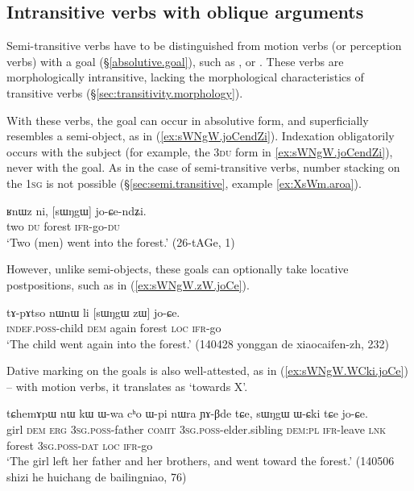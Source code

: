 \subsection{Intransitive verbs with oblique arguments} \label{sec:intr.goal}
Semi-transitive verbs have to be distinguished from motion verbs (or perception verbs) with a goal (§\ref{absolutive.goal}), such as ,  or . These verbs are morphologically intransitive, lacking the morphological characteristics of transitive verbs (§\ref{sec:transitivity.morphology}). 
 
With these verbs, the goal can occur in absolutive form, and superficially resembles a semi-object, as  in (\ref{ex:sWNgW.joCendZi}). Indexation obligatorily occurs with the subject (for example, the \textsc{3du} form in \ref{ex:sWNgW.joCendZi}), never with the goal. As in the case of semi-transitive verbs, number stacking on the \textsc{1sg}  is not possible (§\ref{sec:semi.transitive}, example \ref{ex:XsWm.aroa}).

\begin{exe}
\ex   \label{ex:sWNgW.joCendZi}
 \gll ʁnɯz ni, [sɯŋgɯ] jo-ɕe-ndʑi. \\
two \textsc{du} forest \textsc{ifr}-go-\textsc{du} \\
\glt `Two (men) went into the forest.' (26-tAGe, 1)
\end{exe}

However, unlike semi-objects, these goals can optionally take locative postpositions, such as  in (\ref{ex:sWNgW.zW.joCe}).

\begin{exe}
\ex   \label{ex:sWNgW.zW.joCe}
 \gll tɤ-pɤtso nɯnɯ li [sɯŋgɯ zɯ] jo-ɕe. \\
 \textsc{indef}.\textsc{poss}-child \textsc{dem} again forest \textsc{loc} \textsc{ifr}-go \\
 \glt `The child went again into the forest.' (140428 yonggan de xiaocaifen-zh, 232)
\end{exe}

Dative marking on the goals is also well-attested, as in (\ref{ex:sWNgW.WCki.joCe}) -- with motion verbs, it translates as `towards X'.

\begin{exe}
\ex   \label{ex:sWNgW.WCki.joCe}
 \gll tɕhemɤpɯ nɯ kɯ ɯ-wa cʰo ɯ-pi nɯra ɲɤ-βde tɕe, sɯŋgɯ ɯ-ɕki tɕe jo-ɕe. \\
girl \textsc{dem} \textsc{erg} \textsc{3sg}.\textsc{poss}-father \textsc{comit} \textsc{3sg}.\textsc{poss}-elder.sibling \textsc{dem}:\textsc{pl} \textsc{ifr}-leave \textsc{lnk} forest \textsc{3sg}.\textsc{poss}-\textsc{dat} \textsc{loc} \textsc{ifr}-go \\
\glt `The girl left her father and her brothers, and went toward the forest.' (140506 shizi he huichang de bailingniao, 76)
\end{exe}

